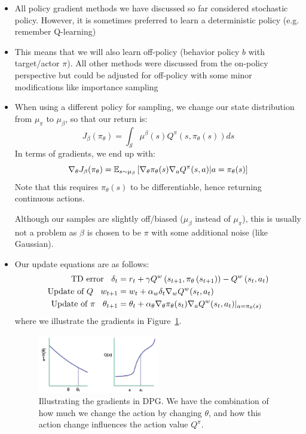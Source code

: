 \begin{itemize}
	\item All policy gradient methods we have discussed so far considered stochastic policy. However, it is sometimes preferred to learn a deterministic policy (e.g. remember Q-learning)
	\item This means that we will also learn off-policy (behavior policy $b$ with target/actor $\pi$). All other methods were discussed from the on-policy perspective but could be adjusted for off-policy with some minor modifications like importance sampling
	\item When using a different policy for sampling, we change our state distribution from $\mu_{\pi}$ to $\mu_{\beta}$, so that our return is:
	$$J_{\beta}(\pi_{\theta}) = \int_{\mathcal{S}} \mu^{\beta}(s)Q^{\pi}\left(s,\pi_{\theta}(s)\right)ds$$
	In terms of gradients, we end up with:
	$$\nabla_{\theta} J_{\beta}(\pi_{\theta})=\mathbb{E}_{s\sim\mu_{\beta}}\left[\nabla_{\theta}\pi_{\theta}(s)\nabla_a Q^{\pi}(s,a)|a=\pi_{\theta}(s)\right] $$
	Note that this requires $\pi_{\theta}(s)$ to be differentiable, hence returning continuous actions.
	
	Although our samples are slightly off/biased ($\mu_{\beta}$ instead of $\mu_{\pi}$), this is usually not a problem as $\beta$ is chosen to be $\pi$ with some additional noise (like Gaussian).
	\item Our update equations are as follows:
	\begin{equation*}
		\begin{split}
			\text{TD error }\hspace{2mm}\delta_t & = r_t + \gamma Q^{w}\left(s_{t+1}, \pi_{\theta}\left(s_{t+1}\right)\right) - Q^{w}\left(s_{t}, a_t\right)\\
			\text{Update of $Q$ }\hspace{2mm}w_{t+1} & = w_{t} + \alpha_{w}\delta_t \nabla_{w} Q^{w}(s_t,a_t)\\
			\text{Update of $\pi$ }\hspace{2mm}\theta_{t+1} & = \theta_{t} + \alpha_{\theta} \nabla_{\theta} \pi_{\theta}(s_t) \nabla_{a} Q^{w}(s_t,a_t)|_{a=\pi_{\theta}(s)}
		\end{split}
	\end{equation*}
	where we illustrate the gradients in Figure~\ref{fig:rl_policy_gradients_DPG}.
	\begin{figure}[ht!]
		\centering
		\includegraphics[width=0.5\textwidth]{figures/rl_policy_gradients_DPG.png}
		\caption{Illustrating the gradients in DPG. We have the combination of how much we change the action by changing $\theta$, and how this action change influences the action value $Q^{\pi}$.}
		\label{fig:rl_policy_gradients_DPG}
	\end{figure}
\end{itemize}
